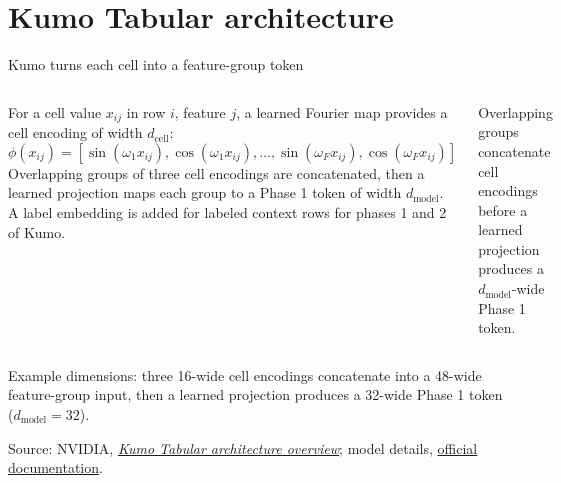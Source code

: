\documentclass[11pt,aspectratio=169,hyperref={colorlinks}]{beamer}
\newcommand{\slidesource}[1]{\par\vfill\noindent\parbox{\linewidth}{\tiny\color{sourcegray}\raggedright\sloppy Source: #1.}}
\newcommand{\visualdescription}[1]{\par\vspace{.2em}\noindent\parbox{\linewidth}{\centering\tiny\color{sourcegray}#1}}
\begin{document}
\section{Kumo Tabular architecture}
\begin{frame}{Kumo turns each cell into a feature-group token}
\small
\begin{columns}[c]
For a cell value $x_{ij}$ in row $i$, feature $j$, a learned Fourier map provides a cell encoding of width $d_{\text{cell}}$:
\[
{\scriptstyle \phi(x_{ij})=[\sin(\omega_1x_{ij}),\cos(\omega_1x_{ij}),\ldots,\sin(\omega_Fx_{ij}),\cos(\omega_Fx_{ij})]}
\]
Overlapping groups of three cell encodings are concatenated, then a learned projection maps each group to a Phase 1 token of width $d_{\text{model}}$. A label embedding is added for labeled context rows for phases 1 and 2 of Kumo.
\centering
{}
\visualdescription{Overlapping groups concatenate cell encodings before a learned projection produces a $d_{\text{model}}$-wide Phase 1 token.}
\end{columns}
\medskip
Example dimensions: three 16-wide cell encodings concatenate into a 48-wide feature-group input, then a learned projection produces a 32-wide Phase 1 token ($d_{\text{model}}=32$).
\slidesource{NVIDIA, \href{https://huggingface.co/blog/nvidia/kumo-tabular}{\emph{Kumo Tabular architecture overview}}; model details, \href{https://docs.nvidia.com/sdgm/structured-data-models/models/kumo-tabular}{official documentation}}
\end{frame}
\end{document}
